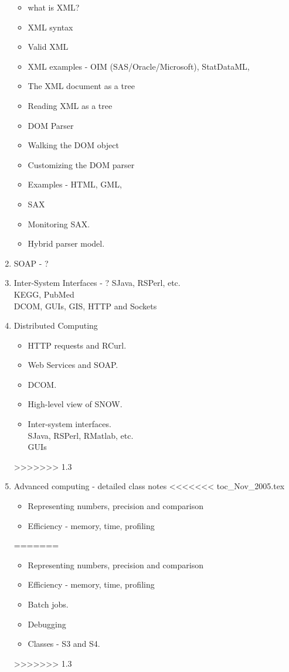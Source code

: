 \documentclass[11pt,timesroman]{article}
\begin{document}
\begin{enumerate}
        \begin{itemize}
        \item what is XML?
        \item XML syntax
        \item Valid XML 
        \item XML examples - OIM (SAS/Oracle/Microsoft), StatDataML, 
        \item The XML document as a tree
        \item Reading XML as a tree
        \item DOM Parser
        \item Walking the DOM object
        \item Customizing the DOM parser
        \item Examples - HTML, GML, 
        \item SAX
        \item Monitoring SAX.
        \item Hybrid parser model. 
        \end{itemize}

\item{SOAP - ?}

\item{Inter-System Interfaces - ?}
SJava, RSPerl, etc.
\\
KEGG, PubMed
\\
DCOM, GUIs, GIS, HTTP and Sockets


\item{Distributed Computing}
  \begin{itemize}
  \item HTTP requests and RCurl.
  \item Web Services and SOAP.
  \item DCOM.
  \item High-level view of SNOW.
  \item Inter-system interfaces. \\
      SJava, RSPerl, RMatlab, etc. \\
      GUIs 
  \end{itemize}
>>>>>>> 1.3

\item{Advanced computing - detailed class notes}
<<<<<<< toc_Nov_2005.tex
        \begin{itemize}
        \item Representing numbers, precision and comparison
        \item Efficiency - memory, time, profiling
        \end{itemize}
=======
        \begin{itemize}
        \item Representing numbers, precision and comparison
        \item Efficiency - memory, time, profiling
        \item Batch jobs.
        \item Debugging
        \item Classes - S3 and S4.
        \end{itemize}
>>>>>>> 1.3



\end{enumerate}
\end{document}
